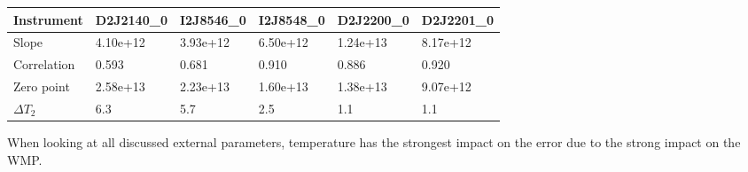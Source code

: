 \documentclass  [
  paper    = a4,
  BCOR     = 10mm,
  twoside,
  fontsize = 12pt,
  fleqn,
  toc      = bibnumbered,
  toc      = listofnumbered,
  numbers  = noendperiod,
  headings = normal,
  listof   = leveldown,
  version  = 3.03
]                                       {scrreprt}
\begin{document}
	\begin{table}[h]
		\begin{tabular}{|p{2cm}|p{2cm}|p{2cm}|p{2cm}|p{2cm}|p{2cm}|}
		Instrument	&D2J2140\_0&I2J8546\_0& I2J8548\_0&D2J2200\_0&D2J2201\_0\\
			\toprule
			Slope&4.10e+12 &3.93e+12 &6.50e+12 &1.24e+13&8.17e+12 \\
			\midrule
			Correlation
			& 
			0.593& 
			0.681& 
			0.910& 
			0.886& 
			0.920\\
			\midrule
			Zero point&2.58e+13&2.23e+13&1.60e+13& 1.38e+13& 9.07e+12\\
			\midrule
			$\Delta T_{2}$&6.3&5.7&2.5&1.1&1.1\\
			\bottomrule
		\end{tabular}
		\label{tab:tempe}
	\end{table}
	When looking at all discussed external parameters, temperature has  the strongest impact on the  error due to the strong impact on the WMP.
\end{document}

